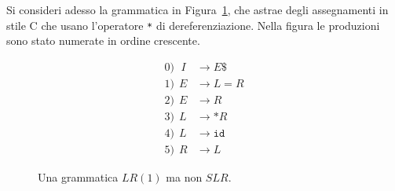 Si  consideri adesso la grammatica in Figura~\ref{fig:c_grammar}, che
astrae degli assegnamenti in stile C che usano l'operatore \texttt{*} di
dereferenziazione. Nella figura le produzioni sono stato numerate in ordine
crescente.
%
\begin{figure}[t]
\begin{align*}
  0)\ \ \,I &\to E\mathtt{\$}\\
  1)\ \ E &\to L\mathtt{=}R\\
  2)\ \ E &\to R\\
  3)\ \ L &\to \mathtt{*}R\\
  4)\ \ L &\to \mathtt{id}\\
  5)\ \ R &\to L
\end{align*}
\caption{Una grammatica $\mathit{LR}(1)$ ma non $\mathit{SLR}$.}
  \label{fig:c_grammar}
\end{figure}
%
